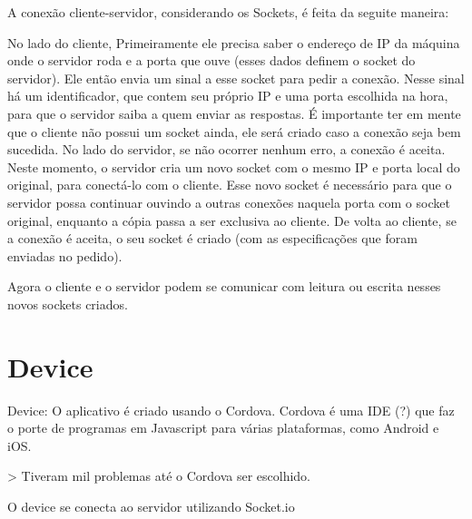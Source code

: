 \documentclass[a4paper,12pt]{article}
\begin{document}
A conexão cliente-servidor, considerando os Sockets, é feita da seguite maneira:

No lado do cliente, Primeiramente ele precisa saber o endereço de IP da máquina onde o servidor roda e a porta que ouve (esses dados definem o socket do servidor). Ele então envia um sinal a esse socket para pedir a conexão. Nesse sinal há um identificador, que contem seu próprio IP e uma porta escolhida na hora, para que o servidor saiba a quem enviar as respostas. É importante ter em mente que o cliente não possui um socket ainda, ele será criado caso a conexão seja bem sucedida.
No lado do servidor, se não ocorrer nenhum erro, a conexão é aceita. Neste momento, o servidor cria um novo socket com o mesmo IP e porta local do original, para conectá-lo com o cliente. Esse novo socket é necessário para que o servidor possa continuar ouvindo a outras conexões naquela porta com o socket original, enquanto a cópia passa a ser exclusiva ao cliente.
De volta ao cliente, se a conexão é aceita, o seu socket é criado (com as especificações que foram enviadas no pedido).

Agora o cliente e o servidor podem se comunicar com leitura ou escrita nesses novos sockets criados.












\section{Device}


Device:
  O aplicativo é criado usando o Cordova.
    Cordova é uma IDE (?) que faz o porte de programas em Javascript para várias plataformas, como Android e iOS.


    > Tiveram mil problemas até o Cordova ser escolhido.


  O device se conecta ao servidor utilizando Socket.io
\end{document}
